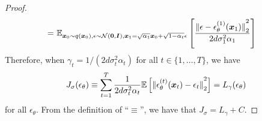 \begin{proof}
\begin{align}
   = & \ {\mathbb{E}}_{\bm{x}_{0} \sim q(\bm{x}_{0}), \epsilon \sim \mathcal{N}({\bm{0}}, \bm{I}), \bm{x}_1 = \sqrt{\alpha_1} \bm{x}_0 + \sqrt{1 - \alpha_t} \epsilon}\left[\frac{{\lVert {\epsilon - \epsilon_{\theta}^{(1)}(\bm{x}_1)} \rVert}_2^2}{2 d \sigma_1^2 \alpha_1}\right]
\end{align}
Therefore, when $\gamma_t = 1 / (2 d \sigma_t^2 \alpha_t)$ for all $t \in \{1, \ldots, T\}$, we have
\begin{align}
    J_\sigma(\epsilon_\theta) \equiv \sum_{t=1}^{T} \frac{1}{2 d \sigma_t^2 \alpha_t} {\mathbb{E}}\left[{\lVert {\epsilon_{\theta}^{(t)}(\bm{x}_t) - \epsilon_t} \rVert}_2^2 \right] = L_\gamma(\epsilon_\theta)
\end{align}
for all $\epsilon_\theta$. From the definition of ``$\equiv$'', we have that $J_\sigma = L_\gamma + C$.
\end{proof}

\equivalence*

